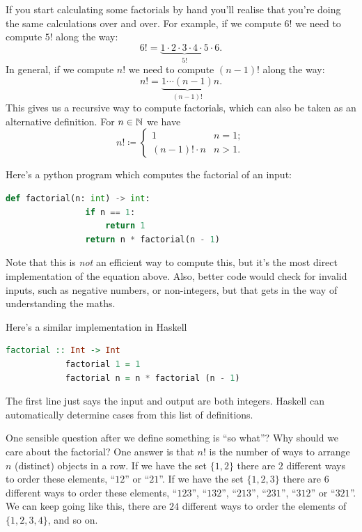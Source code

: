 \documentclass[fleqn]{LectureClass/LectureClass}
\begin{document}
    If you start calculating some factorials by hand you'll realise that you're doing the same calculations over and over.
    For example, if we compute \(6!\) we need to compute \(5!\) along the way:
    \begin{equation}
        6! = \underbrace{1 \cdot 2 \cdot 3 \cdot 4 \cdot 5}_{5!} \cdot 6.
    \end{equation}
    In general, if we compute \(n!\) we need to compute \((n-1)!\) along the way:
    \begin{equation}
        n! = \underbrace{1 \dotsm (n - 1)}_{(n-1)!} n.
    \end{equation}
    This gives us a recursive way to compute factorials, which can also be taken as an alternative definition.
    For \(n \in \mathbb{N}\) we have
    \begin{equation}
        n! \coloneq 
        \begin{cases}
            1 & n = 1;\\
            (n - 1)! \cdot n & n > 1.
        \end{cases}
    \end{equation}
    
    \begin{cde}{}{}
        Here's a python program which computes the factorial of an input:
        \begin{lstlisting}[gobble=12, language=python]
            def factorial(n: int) -> int:
                if n == 1:
                    return 1
                return n * factorial(n - 1)
        \end{lstlisting}
        Note that this is \emph{not} an efficient way to compute this, but it's the most direct implementation of the equation above.
        Also, better code would check for invalid inputs, such as negative numbers, or non-integers, but that gets in the way of understanding the maths.
        
        Here's a similar implementation in Haskell
        \begin{lstlisting}[language=haskell, gobble=12]
            factorial :: Int -> Int
            factorial 1 = 1
            factorial n = n * factorial (n - 1)
        \end{lstlisting}
        The first line just says the input and output are both integers.
        Haskell can automatically determine cases from this list of definitions.
    \end{cde}
    
    One sensible question after we define something is \enquote{so what}?
    Why should we care about the factorial?
    One answer is that \(n!\) is the number of ways to arrange \(n\) (distinct) objects in a row.
    If we have the set \(\{1, 2\}\) there are \(2\) different ways to order these elements, \enquote{\(12\)} or \enquote{\(21\)}.
    If we have the set \(\{1, 2, 3\}\) there are \(6\) different ways to order these elements, \enquote{\(123\)}, \enquote{\(132\)}, \enquote{\(213\)}, \enquote{\(231\)}, \enquote{\(312\)} or \enquote{\(321\)}.
    We can keep going like this, there are \(24\) different ways to order the elements of \(\{1, 2, 3, 4\}\), and so on.
    
\end{document}
